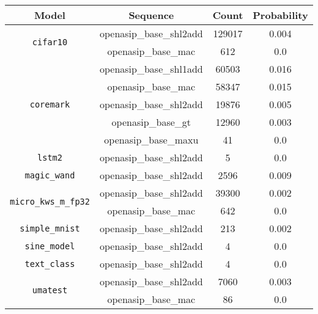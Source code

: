\begin{tabular}{|c|c|c|c|}
    \hline
    \textbf{Model} & \textbf{Sequence} & \textbf{Count} & \textbf{Probability} \\ \hline

    \multirow{2}{*}{\texttt{cifar10}} & openasip\_base\_shl2add & 129017 & 0.004 \\ \cline{2-4}
                                      & openasip\_base\_mac     & 612    & 0.0   \\ \hline

    \multirow{5}{*}{\texttt{coremark}} & openasip\_base\_shl1add & 60503  & 0.016 \\ \cline{2-4}
                                       & openasip\_base\_mac     & 58347  & 0.015 \\ \cline{2-4}
                                       & openasip\_base\_shl2add & 19876  & 0.005 \\ \cline{2-4}
                                       & openasip\_base\_gt      & 12960  & 0.003 \\ \cline{2-4}
                                       & openasip\_base\_maxu    & 41     & 0.0   \\ \hline

    \multirow{1}{*}{\texttt{lstm2}}    & openasip\_base\_shl2add & 5      & 0.0   \\ \hline

    \multirow{1}{*}{\texttt{magic\_wand}} & openasip\_base\_shl2add & 2596 & 0.009 \\ \hline

    \multirow{2}{*}{\texttt{micro\_kws\_m\_fp32}} & openasip\_base\_shl2add & 39300 & 0.002 \\ \cline{2-4}
                                                  & openasip\_base\_mac     & 642   & 0.0   \\ \hline

    \multirow{1}{*}{\texttt{simple\_mnist}} & openasip\_base\_shl2add & 213   & 0.002 \\ \hline

    \multirow{1}{*}{\texttt{sine\_model}}   & openasip\_base\_shl2add & 4     & 0.0   \\ \hline

    \multirow{1}{*}{\texttt{text\_class}}   & openasip\_base\_shl2add & 4     & 0.0   \\ \hline

    \multirow{2}{*}{\texttt{umatest}}       & openasip\_base\_shl2add & 7060  & 0.003 \\ \cline{2-4}
                                            & openasip\_base\_mac     & 86    & 0.0   \\ \hline

\end{tabular}


